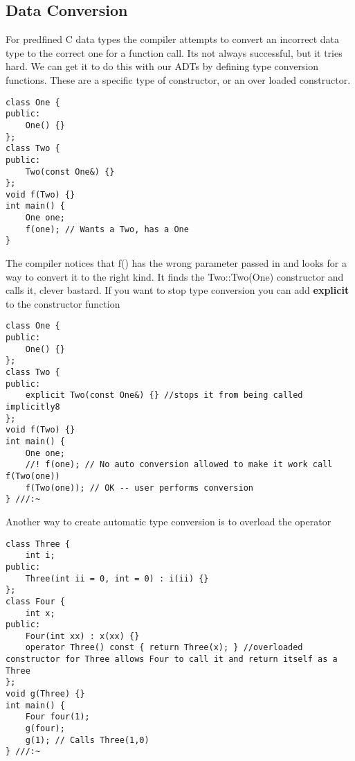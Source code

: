 \documentclass[12pt]{article}
\begin{document}
\subsection*{Data Conversion}
For predfined C data types the compiler attempts to convert an incorrect data type to the correct one for a function call. Its not always successful, but it tries hard. We can get it to do this with our ADTs by defining type conversion functions. These are a specific type of constructor, or an over loaded constructor.
\begin{lstlisting}
class One {
public:
    One() {}
};
class Two {
public:
    Two(const One&) {}
};
void f(Two) {}
int main() {
    One one;
    f(one); // Wants a Two, has a One
}
\end{lstlisting}
The compiler notices that f() has the wrong parameter passed in and looks for a way to convert it to the right kind. It finds the Two::Two(One) constructor and calls it, clever bastard. If you want to stop type conversion you can add \textbf{explicit} to the constructor function
\begin{lstlisting}
class One {
public:
    One() {}
};
class Two {
public:
    explicit Two(const One&) {} //stops it from being called implicitly8
};
void f(Two) {}
int main() {
    One one;
    //! f(one); // No auto conversion allowed to make it work call f(Two(one))
    f(Two(one)); // OK -- user performs conversion
} ///:~
\end{lstlisting}

Another way to create automatic type conversion is to overload the operator
\begin{lstlisting}
class Three {
    int i;
public:
    Three(int ii = 0, int = 0) : i(ii) {}
};
class Four {
    int x;
public:
    Four(int xx) : x(xx) {}
    operator Three() const { return Three(x); } //overloaded constructor for Three allows Four to call it and return itself as a Three
};
void g(Three) {}
int main() {
    Four four(1);
    g(four);
    g(1); // Calls Three(1,0)
} ///:~
\end{lstlisting}
\end{document}
